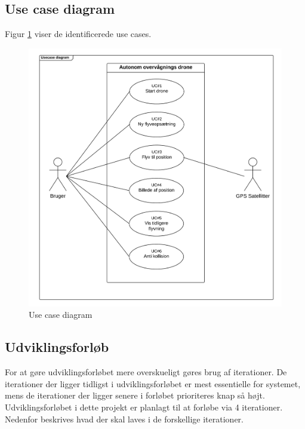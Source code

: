 \newpage 

\subsection{Use case diagram}
\label{subsec:useCaseDiagram}
Figur \ref{fig:UCD} viser de identificerede use cases.
\vspace{-10pt}
\begin{figure}[H]
\includegraphics[width=1\textwidth]{Billeder/Use_case_diagram.png}
\vspace{-30pt}
\caption{Use case diagram}
\label{fig:UCD}
\end{figure}




\newpage
\subsection{Udviklingsforløb}

For at gøre udviklingsforløbet mere overskueligt gøres brug af iterationer.
De iterationer der ligger tidligst i udviklingsforløbet er mest essentielle for systemet, 
mens de iterationer der ligger senere i forløbet prioriteres knap så højt.
Udviklingsforløbet i dette projekt er planlagt til at forløbe via 4 iterationer. Nedenfor beskrives hvad der skal laves i de forskellige iterationer. \\


